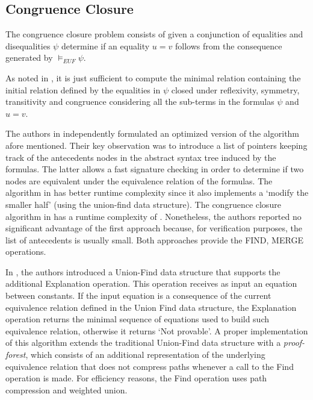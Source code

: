 \subsection{Congruence Closure}

The congruence closure problem consists of given a 
conjunction of equalities and disequalities $\psi$ 
determine if an equality $u = v$ follows from the 
consequence generated by $\models_{EUF} 
\psi$.

As noted in \cite{10.5555/1097042}, it is just sufficient
to compute the minimal relation containing the initial 
relation defined by the
equalities in $\psi$ closed under reflexivity, symmetry,
transitivity and congruence considering all the sub-terms
in the formulas $\psi$ and $u = v$.

The authors in \cite{10.1145/322217.322228, 
10.1145/322186.322198} independently formulated an optimized
version of the algorithm afore mentioned. Their key observation
was to introduce a list of pointers keeping track of the
antecedents nodes in the abstract syntax tree induced by
the formulas. The latter allows a fast signature checking
in order to determine if two nodes are equivalent under
the equivalence relation of the formulas. The algorithm
in \cite{10.1145/322217.322228} has better runtime
complexity  since it also implements 
a `modify the smaller half' (using the union-find 
data structure). The congruence closure algorithm in 
\cite{10.1145/322217.322228} has a runtime complexity
of . Nonetheless, the authors reported no 
significant advantage of the first approach
because, for verification purposes, the list of antecedents is
usually small. Both approaches provide the FIND, MERGE 
operations.

In \cite{10.1007/978-3-540-32033-3_33}, the authors 
introduced a Union-Find data structure that supports the 
additional 
Explanation operation. This operation receives as input 
an equation between constants. If the input equation is 
a consequence of the current equivalence relation defined 
in the Union Find data structure, the Explanation operation 
returns the minimal sequence of equations used to build 
such equivalence relation, otherwise it returns 
`Not provable'. A proper implementation of this algorithm 
extends the traditional Union-Find data structure with 
a \emph{proof-forest}, which consists of an additional 
representation of the underlying equivalence relation that 
does not compress paths whenever a call to the Find 
operation is made. For efficiency reasons, the Find 
operation uses path compression and weighted union.

